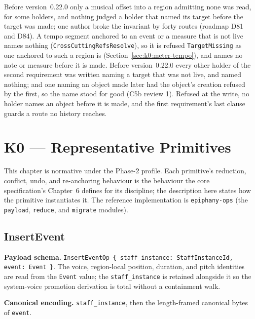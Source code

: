 \documentclass[11pt,letterpaper]{report}
\newcounter{requirement}[chapter]
\begin{document}
\begin{rationale}
  Before version~0.22.0 only a musical offset into a region admitting none was
  read, for some holders, and nothing judged a holder that named its target
  before the target was made; one author broke the invariant by forty routes
  (roadmap D81 and D84). A tempo segment anchored to an event or a measure that
  is not live names nothing (\texttt{CrossCuttingRefsResolve}), so it is refused
  \texttt{TargetMissing} as one anchored to such a region is
  (Section~\ref{sec:k0:meter-tempo}), and names no note or measure before it is
  made. Before version~0.22.0 every other holder of the second requirement was
  written naming a target that was not live, and named nothing; and one
  naming an object made later had the object's creation refused by the first,
  so the name stood for good (C5b review 1). Refused at the write, no holder
  names an object before it is made, and the first requirement's last clause
  guards a route no history reaches.
\end{rationale}

\chapter{K0 --- Representative Primitives}
\label{ch:k0}

This chapter is normative under the Phase-2 profile. Each primitive's reduction,
conflict, undo, and re-anchoring behaviour is the behaviour the core
specification's Chapter~6 defines for its discipline; the description here states
how the primitive instantiates it. The reference implementation is
\texttt{epiphany-ops} (the \texttt{payload}, \texttt{reduce}, and \texttt{migrate}
modules).

\section{InsertEvent}
\label{sec:k0:insert-event}

\textbf{Payload schema.} \texttt{InsertEventOp \{ staff\_instance:
StaffInstanceId, event: Event \}}. The voice, region-local position, duration,
and pitch identities are read from the \texttt{Event} value; the
\texttt{staff\_instance} is retained alongside it so the system-voice promotion
derivation is total without a containment walk.

\textbf{Canonical encoding.} \texttt{staff\_instance}, then the length-framed
canonical bytes of \texttt{event}.
\end{document}
